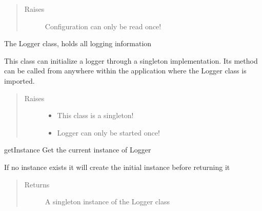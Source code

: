 \documentclass[letterpaper,10pt,english]{sphinxmanual}
\begin{document}
\begin{fulllineitems}
\begin{fulllineitems}
\begin{quote}
\begin{description}
\item[{Raises}] \leavevmode
{} \textendash{} Configuration can only be read once!

\end{description}\end{quote}

\end{fulllineitems}


\end{fulllineitems}


\begin{fulllineitems}
\label{\detokenize{index:config.config_manager.Logger}}
The Logger class, holds all logging information

This class can initialize a logger through a singleton
implementation. Its method can be called from anywhere
within the application where the Logger class is imported.
\begin{quote}\begin{description}
\item[{Raises}] \leavevmode\begin{itemize}
\item {} 
 \textendash{} This class is a singleton!

\item {} 
 \textendash{} Logger can only be started once!

\end{itemize}

\end{description}\end{quote}

\begin{fulllineitems}
\label{\detokenize{index:config.config_manager.Logger.getInstance}}
getInstance Get the current instance of Logger

If no instance exists it will create the initial
instance before returning it
\begin{quote}\begin{description}
\item[{Returns}] \leavevmode
A singleton instance of the Logger class


\end{description}
\end{quote}
\end{fulllineitems}
\end{fulllineitems}
\end{document}
